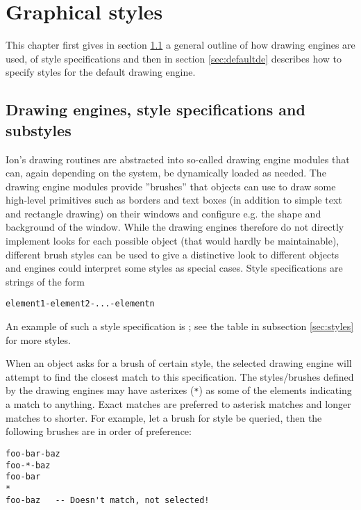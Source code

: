 
\chapter{Graphical styles}
\label{chap:gr}

This chapter first gives in section \ref{sec:engines} a general outline 
of how drawing engines are used, of style specifications and then
in section \ref{sec:defaultde} describes how to specify styles
for the default drawing engine.

\section{Drawing engines, style specifications and substyles}
\label{sec:engines}

Ion's drawing routines are abstracted into so-called drawing engine
modules that can, again depending on the system, be dynamically
loaded as needed. The drawing engine modules provide ''brushes''
that objects can use to draw some high-level primitives such
as borders and text boxes (in addition to simple text and rectangle
drawing) on their windows and configure e.g. the shape and 
background of the window. While the drawing engines therefore
do not directly implement looks for each possible object (that
would hardly be maintainable), different brush styles can be
used to give a distinctive look to different objects and engines
could interpret some styles as special cases. Style specifications 
are strings of the form

\begin{verbatim}
element1-element2-...-elementn
\end{verbatim}

An example of such a style specification is ;
see the table in subsection \ref{sec:styles} for more styles.

When an object asks for a brush of certain style, the selected
drawing engine will attempt to find the closest match to this
specification. The styles/brushes defined by the drawing engines 
may have asterixes (\verb!*!) as some of the elements indicating
a match to anything. Exact matches are preferred to asterisk
matches and longer matches to shorter. For example, let a brush
for style  be queried, then the following
brushes are in order of preference:

\begin{verbatim}
foo-bar-baz
foo-*-baz
foo-bar
*
foo-baz   -- Doesn't match, not selected!
\end{verbatim}

